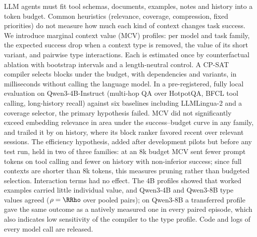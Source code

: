 LLM agents must fit tool schemas, documents, examples, notes and history into a token budget. Common heuristics (relevance,
coverage, compression, fixed priorities) do not measure how much each kind of context changes task success. We introduce marginal context value (MCV) profiles: per model and task family,
the expected success drop when a context type is removed, the value of its short variant, and pairwise type
interactions. Each is estimated once by counterfactual ablation with bootstrap intervals and a length-neutral control. A
CP-SAT compiler selects blocks under the budget, with dependencies and variants, in milliseconds without calling the language model.
In a pre-registered, fully local evaluation on Qwen3-4B-Instruct (multi-hop QA over HotpotQA, BFCL tool calling,
long-history recall) against six baselines including LLMLingua-2 and a coverage selector, the primary hypothesis failed.
MCV did not significantly exceed embedding relevance in area under the success--budget curve in any family, and trailed it by
\RHOneHistoryAbs{} on history, where its block ranker favored recent over relevant sessions. The efficiency hypothesis,
added after development pilots but before any test run, held in two of three families: at an 8k budget MCV sent \RTokCutTool fewer prompt tokens on tool calling and
\RTokCutHistory fewer on history with non-inferior success; since full contexts are shorter than 8k tokens, this measures pruning rather than
budgeted selection. Interaction terms had no effect. The 4B profiles showed that
worked examples carried little individual value, and Qwen3-4B and Qwen3-8B type values agreed ($\rho=\RRho$ over
\RRhoN pooled pairs); on Qwen3-8B a transferred profile gave the same outcome as a natively measured one in every
paired episode, which also indicates low sensitivity of the compiler to the type profile. Code and logs of every model call are released.

